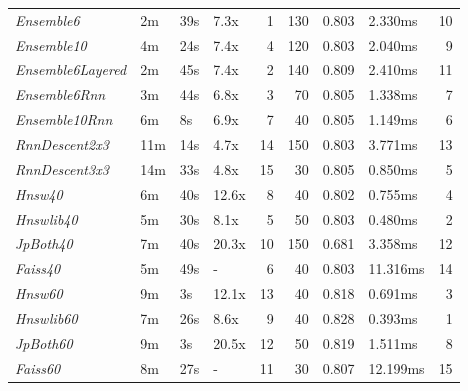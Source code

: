 \begin{tabular}{llllrrrlr}
\toprule
\midrule
\emph{Ensemble6} & 2m & 39s & 7.3x & 1 & 130 & 0.803 & 2.330ms & 10 \\
\emph{Ensemble10} & 4m & 24s & 7.4x & 4 & 120 & 0.803 & 2.040ms & 9 \\
\emph{Ensemble6Layered} & 2m & 45s & 7.4x & 2 & 140 & 0.809 & 2.410ms & 11 \\
\emph{Ensemble6Rnn} & 3m & 44s & 6.8x & 3 & 70 & 0.805 & 1.338ms & 7 \\
\emph{Ensemble10Rnn} & 6m & 8s & 6.9x & 7 & 40 & 0.805 & 1.149ms & 6 \\
\emph{RnnDescent2x3} & 11m & 14s & 4.7x & 14 & 150 & 0.803 & 3.771ms & 13 \\
\emph{RnnDescent3x3} & 14m & 33s & 4.8x & 15 & 30 & 0.805 & 0.850ms & 5 \\
\emph{Hnsw40} & 6m & 40s & 12.6x & 8 & 40 & 0.802 & 0.755ms & 4 \\
\emph{Hnswlib40} & 5m & 30s & 8.1x & 5 & 50 & 0.803 & 0.480ms & 2 \\
\emph{JpBoth40} & 7m & 40s & 20.3x & 10 & 150 & 0.681 & 3.358ms & 12 \\
\emph{Faiss40} & 5m & 49s & - & 6 & 40 & 0.803 & 11.316ms & 14 \\
\emph{Hnsw60} & 9m & 3s & 12.1x & 13 & 40 & 0.818 & 0.691ms & 3 \\
\emph{Hnswlib60} & 7m & 26s & 8.6x & 9 & 40 & 0.828 & 0.393ms & 1 \\
\emph{JpBoth60} & 9m & 3s & 20.5x & 12 & 50 & 0.819 & 1.511ms & 8 \\
\emph{Faiss60} & 8m & 27s & - & 11 & 30 & 0.807 & 12.199ms & 15 \\
\bottomrule
\end{tabular}
